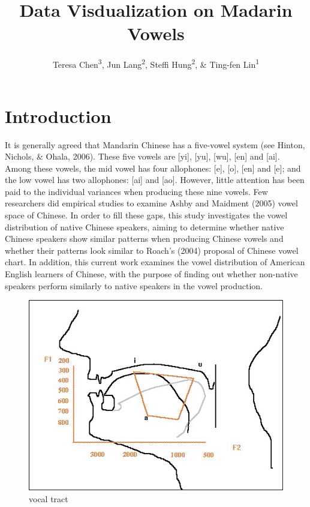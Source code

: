 \documentclass[man, fleqn, noextraspace]{apa6}
\title{Data Visdualization on Madarin Vowels}
\author{Teresa Chen\textsuperscript{3}, Jun Lang\textsuperscript{2}, Steffi
Hung\textsuperscript{2}, \& Ting-fen Lin\textsuperscript{1}}
\date{}
\affiliation{
\vspace{0.5cm}
\textsuperscript{1} Department of Human Physiology\\\textsuperscript{2} Department of East Asian Languages \& Linguistics\\\textsuperscript{3} Communication Disorders \& Sciences}
\begin{document}
\maketitle

{
\setcounter{tocdepth}{5}
\tableofcontents
}
\newpage

\section{Introduction}\label{introduction}

It is generally agreed that Mandarin Chinese has a five-vowel system
(see Hinton, Nichols, \& Ohala, 2006). These five vowels are {[}yi{]},
{[}yu{]}, {[}wu{]}, {[}en{]} and {[}ai{]}. Among these vowels, the mid
vowel has four allophones: {[}e{]}, {[}o{]}, {[}en{]} and {[}e{]}; and
the low vowel has two allophones: {[}ai{]} and {[}ao{]}. However, little
attention has been paid to the individual variances when producing these
nine vowels. Few researchers did empirical studies to examine Ashby and
Maidment (2005) vowel space of Chinese. In order to fill these gaps,
this study investigates the vowel distribution of native Chinese
speakers, aiming to determine whether native Chinese speakers show
similar patterns when producing Chinese vowels and whether their
patterns look similar to Roach's (2004) proposal of Chinese vowel chart.
In addition, this current work examines the vowel distribution of
American English learners of Chinese, with the purpose of finding out
whether non-native speakers perform similarly to native speakers in the
vowel production.

\begin{figure}
\centering
\includegraphics{picture/mouth.jpg}
\caption{vocal tract}
\end{figure}
\end{document}
